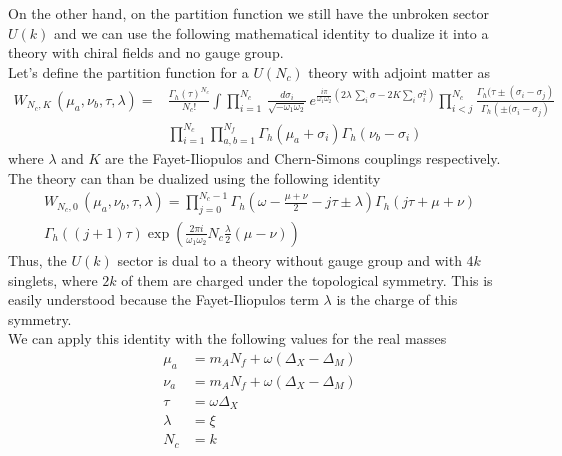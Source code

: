 On the other hand, on the partition function we still have the unbroken sector $U(k)$ and we can use the following mathematical identity \cite{vanDeBult:2007} to dualize it into a theory with chiral fields and no gauge group.
\\
Let's define the partition function for a $U(N_c)$ theory with adjoint matter as
\begin{equation}
\begin{aligned}
W_{N_c , K } \, ( \mu_a, \nu_b , \tau, \lambda ) = & \frac{\Gamma_h (\tau)^{N_c}}{N_c !}
\int \prod_{i=1}^{N_c} \, \frac{d \sigma_i }{\sqrt{- \omega_1 \omega_2}} \, e^{ \frac{i \pi}{ \omega_1 \omega_2} \left( 2 \lambda
\, \sum_i \sigma - 2 K \sum_i \sigma_i^2 \right)} 
\prod_{ i <j }^{N_c}
\frac{ \Gamma_h ( \tau \pm ( \sigma_i - \sigma_j) }{ \Gamma_h  \left( \pm (\sigma_i - \sigma_j \right) } \\
&  \prod_{i=1}^{N_c} \prod_{a,b=1}^{N_f} \Gamma_h ( \mu_a + \sigma_i) \Gamma_h(\nu_b- \sigma_i)
\end{aligned}
\end{equation}
where $\lambda$ and $K$ are the Fayet-Iliopulos and Chern-Simons couplings respectively.\\
The theory can than be dualized using the following identity \cite{vanDeBult:2007}
\begin{multline}
W_{N_c , 0 } \, ( \mu_a, \nu_b , \tau, \lambda )  = 
\prod_{j=0}^{N_c - 1} 
\Gamma_h \left(  \omega - \frac{\mu + \nu}{2} - j \tau \pm \lambda \right)
\Gamma_h \left( j \tau + \mu + \nu     \right) \\
\Gamma_h\left( (j+1) \tau   \right) 
\exp{ \left( \frac{2 \pi i}{\omega_1 \omega_2 } N_c \frac{\lambda}{2} (\mu - \nu) \right)}
\label{eqn:dualization-mirror}
\end{multline}
Thus, the $U(k)$ sector is dual to a theory without gauge group and with $4k$ singlets, where $2k$ of them are charged under the topological symmetry. 
This is easily understood because the Fayet-Iliopulos term $\lambda$ is the charge of this symmetry.\\
We can apply this identity with the following values for the real masses
\begin{equation}
\begin{aligned}
	\mu_a & =  m_A N_f + \omega( \Delta_X - \Delta_M ) \\
	\nu_a  &=  m_A N_f + \omega( \Delta_X -\Delta_M )\\
	\tau  & =  \omega \Delta_X  \\
	\lambda & = \xi\\
	N_c & = k 
\end{aligned}
\end{equation}
